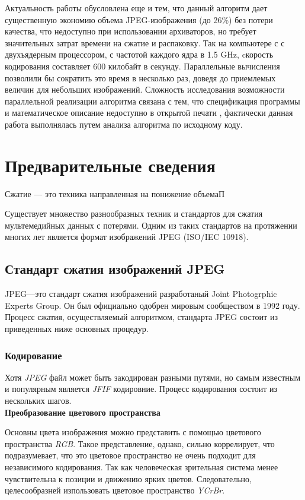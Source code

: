 \documentclass{matmex-diploma-custom}
\begin{document}
Актуальность работы обусловлена еще и тем, что данный алгоритм дает существенную экономию объема JPEG-изображения (до 26\%) без потери качества, что недоступно при использовании архиваторов, но требует значительных затрат времени на сжатие и распаковку. Так на компьютере с с двухъядерным процессором, с частотой каждого ядра в 1.5 GHz, cкорость кодирования составляет 600 килобайт в секунду. Параллельные вычисления позволили бы сократить это время в несколько раз, доведя до приемлемых величин для небольших изображений. Сложность исследования возможности параллельной реализации алгоритма связана с тем, что спецификация программы и математическое описание недоступно в открытой печати , фактически данная работа выполнялась путем анализа алгоритма по исходному коду.

\section{Предварительные сведения}
Сжатие --- это техника направленная на понижение объемаП

Существует множество разнообразных  техник и стандартов для сжатия мультемедийных данных с потерями.
 Одним из таких стандартов на протяжении многих лет является формат изображений JPEG (ISO/IEC 10918).

\subsection{Стандарт сжатия изображений JPEG}
JPEG---это стандарт сжатия изображений разработаный Joint Photogrphic Experts Group. Он был официально одобрен мировым сообществом в 1992 году.%
  Процесс сжатия, осуществляемый алгоритмом, стандарта JPEG состоит из приведенных ниже основных процедур.

\subsubsection{Кодирование}
Хотя \emph{JPEG} файл может быть закодирован разными путями, но самым известным и популярным является \emph{JFIF} кодировние.
Процесс кодирования состоит из нескольких шагов.\\

\textbf{Преобразование цветового пространства} \newline

Основны цвета изображения можно  представить с помощью цветового пространства \emph{RGB}. Такое представление, однако,
сильно коррелирует, что подразумевает, что это цветовое пространство не очень подходит для независимого кодирования. Так как человеческая зрительная система менее чувствительна к позиции и движению ярких  цветов. Следовательно, целесообразней изпользовать цветовое пространство \emph{YCrBr}.\\
\end{document}
